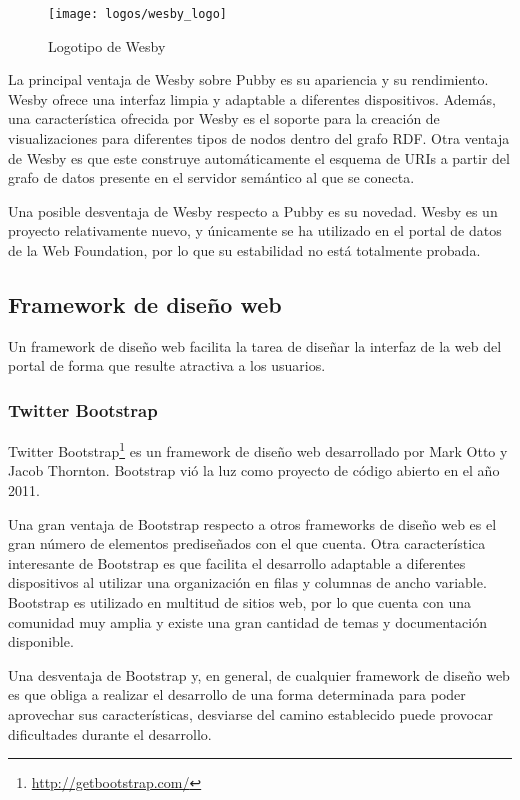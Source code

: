 \begin{figure}[h]
\centering
\texttt{[image: logos/wesby\_logo]}
\caption{Logotipo de Wesby}
\end{figure}

La principal ventaja de Wesby sobre Pubby es su apariencia y su rendimiento. Wesby ofrece una interfaz limpia y adaptable a diferentes dispositivos. Además, una característica ofrecida por Wesby es el soporte para la creación de visualizaciones para diferentes tipos de nodos dentro del grafo RDF. Otra ventaja de Wesby es que este construye automáticamente el esquema de URIs a partir del grafo de datos presente en el servidor semántico al que se conecta.

Una posible desventaja de Wesby respecto a Pubby es su novedad. Wesby es un proyecto relativamente nuevo, y únicamente se ha utilizado en el portal de datos de la Web Foundation, por lo que su estabilidad no está totalmente probada.



\subsection{Framework de diseño web}
Un framework de diseño web facilita la tarea de diseñar la interfaz de la web del portal de forma que resulte atractiva a los usuarios.


\subsubsection{Twitter Bootstrap}
Twitter Bootstrap\footnote{\url{http://getbootstrap.com/}} es un framework de diseño web desarrollado por Mark Otto y Jacob Thornton.  Bootstrap vió la luz como proyecto de código abierto en el año 2011.

Una gran ventaja de Bootstrap respecto a otros frameworks de diseño web es el gran número de elementos prediseñados con el que cuenta. Otra característica interesante de Bootstrap es que facilita el desarrollo adaptable a diferentes dispositivos al utilizar una organización en filas y columnas de ancho variable.\\
Bootstrap es utilizado en multitud de sitios web, por lo que cuenta con una comunidad muy amplia y existe una gran cantidad de temas y documentación disponible.

Una desventaja de Bootstrap y, en general, de cualquier framework de diseño web es que obliga a realizar el desarrollo de una forma determinada para poder aprovechar sus características, desviarse del camino establecido puede provocar dificultades durante el desarrollo.


